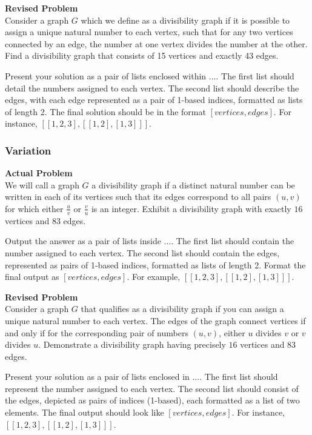 \textbf{Revised Problem}\\
Consider a graph $G$ which we define as a divisibility graph if it is possible to assign a unique natural number to each vertex, such that for any two vertices connected by an edge, the number at one vertex divides the number at the other. Find a divisibility graph that consists of 15 vertices and exactly 43 edges.

Present your solution as a pair of lists enclosed within $\boxed{...}$. The first list should detail the numbers assigned to each vertex. The second list should describe the edges, with each edge represented as a pair of 1-based indices, formatted as lists of length 2. The final solution should be in the format $\boxed{[vertices, edges]}$. For instance, $\boxed{[[1,2,3], [[1, 2], [1, 3]]]}$.

\subsubsection{Variation}
\textbf{Actual Problem}\\
We will call a graph $G$ a divisibility graph if a distinct natural number can be written in each of its vertices such that its edges correspond to all pairs $(u, v)$ for which either $\frac{u}{v}$ or $\frac{v}{u}$ is an integer. Exhibit a divisibility graph with exactly $16$ vertices and $83$ edges.

Output the answer as a pair of lists inside $\boxed{...}$. The first list should contain the number assigned to each vertex. The second list should contain the edges, represented as pairs of 1-based indices, formatted as lists of length 2. Format the final output as $\boxed{[vertices, edges]}$. For example, $\boxed{[[1,2,3], [[1, 2], [1, 3]]]}$.

\textbf{Revised Problem}\\
Consider a graph $G$ that qualifies as a divisibility graph if you can assign a unique natural number to each vertex. The edges of the graph connect vertices if and only if for the corresponding pair of numbers $(u, v)$, either $u$ divides $v$ or $v$ divides $u$. Demonstrate a divisibility graph having precisely $16$ vertices and $83$ edges.

Present your solution as a pair of lists enclosed in $\boxed{...}$. The first list should represent the number assigned to each vertex. The second list should consist of the edges, depicted as pairs of indices (1-based), each formatted as a list of two elements. The final output should look like $\boxed{[vertices, edges]}$. For instance, $\boxed{[[1,2,3], [[1, 2], [1, 3]]]}$.

